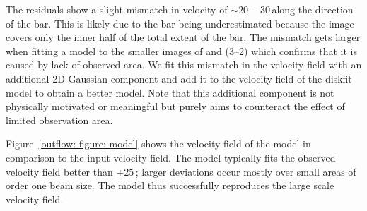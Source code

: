 The residuals show a slight mismatch in velocity of $\sim 20-30$\,\kms along the direction of the bar. This is likely due to the bar being underestimated because the  image covers only the inner half of the total extent of the bar. The mismatch gets larger when fitting a model to the smaller images of  and (3--2) which confirms that it is caused by lack of observed area. We fit this mismatch in the velocity field with an additional 2D Gaussian component and add it to the velocity field of the diskfit model to obtain a better model. Note that this additional component is not physically motivated or meaningful but purely aims to counteract the effect of limited observation area.

Figure~\ref{outflow: figure: model} shows the velocity field of the model in comparison to the input  velocity field. The model typically fits the observed velocity field better than $\pm 25$\,\kms; larger deviations occur mostly over small areas of order one beam size. The model thus successfully reproduces the large scale velocity field.


